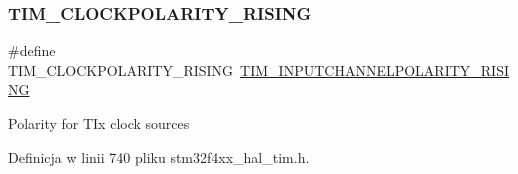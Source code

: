 \subsubsection{\texorpdfstring{T\+I\+M\+\_\+\+C\+L\+O\+C\+K\+P\+O\+L\+A\+R\+I\+T\+Y\+\_\+\+R\+I\+S\+I\+NG}{TIM\_CLOCKPOLARITY\_RISING}}
{\footnotesize\ttfamily \#define T\+I\+M\+\_\+\+C\+L\+O\+C\+K\+P\+O\+L\+A\+R\+I\+T\+Y\+\_\+\+R\+I\+S\+I\+NG~\hyperlink{group___t_i_m___input___channel___polarity_ga4f4cede88a4ad4b33e81f2567e9bb08f}{T\+I\+M\+\_\+\+I\+N\+P\+U\+T\+C\+H\+A\+N\+N\+E\+L\+P\+O\+L\+A\+R\+I\+T\+Y\+\_\+\+R\+I\+S\+I\+NG}}

Polarity for T\+Ix clock sources 

Definicja w linii 740 pliku stm32f4xx\+\_\+hal\+\_\+tim.\+h.

